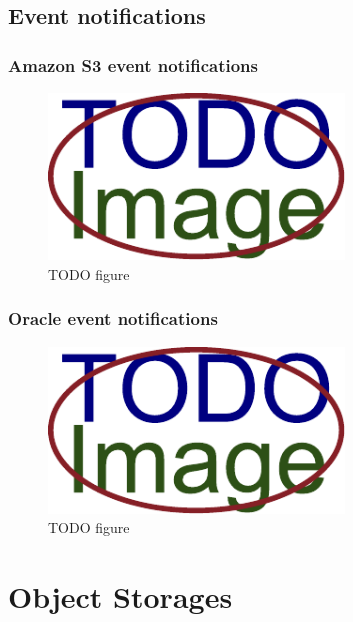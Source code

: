 \section{Event notifications}
    \textcolor{gray}{\Blindtext}
\subsection{Amazon S3 event notifications}
    \textcolor{gray}{\Blindtext}
    \begin{figure}[hbt]
        \centering
        \includegraphics[width=0.7\textwidth]{obrazky-figures/placeholder.pdf}
        \caption{TODO figure}
    \end{figure}
\subsection{Oracle event notifications}
    \textcolor{gray}{\Blindtext}
    \begin{figure}[hbt]
        \centering
        \includegraphics[width=0.7\textwidth]{obrazky-figures/placeholder.pdf}
        \caption{TODO figure}
    \end{figure}

\chapter{Object Storages}
    \textcolor{gray}{\Blindtext}
